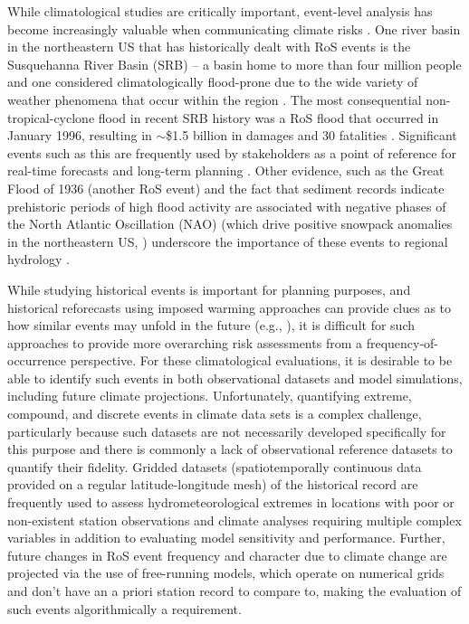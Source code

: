 \documentclass[nhess, manuscript]{copernicus}
\begin{document}
While climatological studies are critically important, event-level analysis has become increasingly valuable when communicating climate risks \citep{shepherd2018storylines}.
One river basin in the northeastern US that has historically dealt with RoS events is the Susquehanna River Basin (SRB) -- a basin home to more than four million people \citep{leathers2008hydroclimatic} and one considered climatologically flood-prone due to the wide variety of weather phenomena that occur within the region \citep{perry2000significant}.
The most consequential non-tropical-cyclone flood in recent SRB history was a RoS flood that occurred in January 1996, resulting in $\sim$\$1.5 billion in damages and 30 fatalities \citep{leathers1998severe}. Significant events such as this are frequently used by stakeholders as a point of reference for real-time forecasts and long-term planning \citep{george2019the}.
Other evidence, such as the Great Flood of 1936 (another RoS event) and the fact that sediment records indicate prehistoric periods of high flood activity are associated with negative phases of the North Atlantic Oscillation (NAO) (which drive positive snowpack anomalies in the northeastern US, \citep{hartley1998synoptic}) underscore the importance of these events to regional hydrology \citep{toomey2019the}.

While studying historical events is important for planning purposes, and historical reforecasts using imposed warming approaches can provide clues as to how similar events may unfold in the future (e.g., \citet{pettett2023the}), it is difficult for such approaches to provide more overarching risk assessments from a frequency-of-occurrence perspective. For these climatological evaluations, it is desirable to be able to identify such events in both observational datasets and model simulations, including future climate projections.
Unfortunately, quantifying extreme, compound, and discrete events in climate data sets is a complex challenge, particularly because such datasets are not necessarily developed specifically for this purpose \citep{angelil2017an,parker2020model} and there is commonly a lack of observational reference datasets to quantify their fidelity.
Gridded datasets (spatiotemporally continuous data provided on a regular latitude-longitude mesh) of the historical record are frequently used to assess hydrometeorological extremes in locations with poor or non-existent station observations and climate analyses requiring multiple complex variables in addition to evaluating model sensitivity and performance.
Further, future changes in RoS event frequency and character due to climate change are projected via the use of free-running models, which operate on numerical grids and don't have an a priori station record to compare to, making the evaluation of such events algorithmically a requirement.
\end{document}
